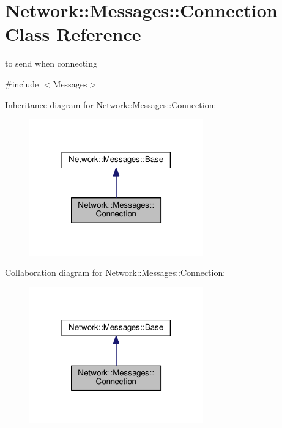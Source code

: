 \hypertarget{class_network_1_1_messages_1_1_connection}{}\section{Network\+:\+:Messages\+:\+:Connection Class Reference}
\label{class_network_1_1_messages_1_1_connection}


to send when connecting  




{\ttfamily \#include $<$Messages$>$}



Inheritance diagram for Network\+:\+:Messages\+:\+:Connection\+:
\nopagebreak
\begin{figure}[H]
\begin{center}
\leavevmode
\includegraphics[width=213pt]{class_network_1_1_messages_1_1_connection__inherit__graph}
\end{center}
\end{figure}


Collaboration diagram for Network\+:\+:Messages\+:\+:Connection\+:
\nopagebreak
\begin{figure}[H]
\begin{center}
\leavevmode
\includegraphics[width=213pt]{class_network_1_1_messages_1_1_connection__coll__graph}
\end{center}
\end{figure}
